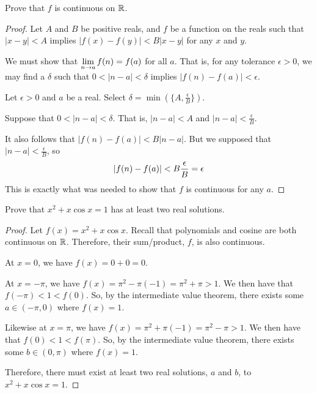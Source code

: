 Prove that $f$ is continuous on $\mathbb{R}$.
\begin{proof}
  Let $A$ and $B$ be positive reals, and $f$ be a function on the reals such that
  $|x-y| < A$ implies $|f(x)-f(y)| < B|x-y|$ for any $x$ and $y$.

  We must show that $\displaystyle\lim_{n\to a}f(n)=f(a)$ for all $a$.
  That is, for any tolerance $\epsilon > 0$,
  we may find a $\delta$ such that $0 < |n-a| < \delta$ implies $|f(n)-f(a)| < \epsilon$.

  Let $\epsilon > 0$ and $a$ be a real. Select $\delta = \min(\{A,\frac{\epsilon}{B}\})$.

  Suppose that $0 < |n-a| < \delta$.
  That is, $|n-a| < A$ and $|n-a| < \frac{\epsilon}{B}$.

  It also follows that $|f(n)-f(a)| < B|n-a|$.
  But we supposed that $|n-a| < \frac{\epsilon}{B}$, so
  \[ \abs{f(n)-f(a)} < B\frac{\epsilon}{B} = \epsilon \]
  This is exactly what was needed to show that $f$ is continuous for any $a$.
\end{proof}

\question Prove that $x^2+x\cos x = 1$ has at least two real solutions.
\begin{proof}
  Let $f(x) = x^2+x\cos x$.
  Recall that polynomials and cosine are both continuous on $\mathbb{R}$.
  Therefore, their sum/product, $f$, is also continuous.

  At $x=0$, we have $f(x)=0+0=0$.

  At $x=-\pi$, we have $f(x)=\pi^2-\pi(-1)=\pi^2+\pi > 1$.
  We then have that $f(-\pi) < 1 < f(0)$.
  So, by the intermediate value theorem, there exists some $a\in(-\pi,0)$ where $f(x)=1$.

  Likewise at $x=\pi$, we have $f(x)=\pi^2+\pi(-1)=\pi^2-\pi > 1$.
  We then have that $f(0) < 1 < f(\pi)$.
  So, by the intermediate value theorem, there exists some $b\in(0,\pi)$ where $f(x)=1$.

  Therefore, there must exist at least two real solutions, $a$ and $b$, to $x^2+x\cos x=1$.
\end{proof}

